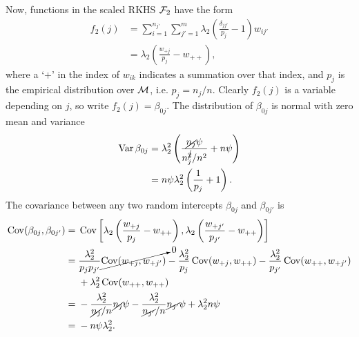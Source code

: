 Now, functions in the scaled RKHS ${\mathcal F}_2$ have the form
\begin{align*}
  f_2(j) 
  &= \sum_{i=1}^{n_{j'}}\sum_{j'=1}^m \lambda_2\left( \frac{\delta_{jj'}}{p_j} - 1 \right)w_{ij'} \\
  &=  \lambda_2\left( \frac{w_{+j}}{p_j} - w_{++} \right),
\end{align*}
where a `$+$' in the index of $w_{ik}$ indicates a summation over that index, and $p_j$ is the empirical distribution over ${\mathcal M}$, i.e. $p_j = n_j/n$.
Clearly $f_2(j)$ is a variable depending on $j$, so write $f_2(j)=\beta_{0j}$.
The distribution of $\beta_{0j}$ is normal with zero mean and variance
\begin{align*}
  \operatorname{Var} \beta_{0j} 
  &= \lambda_2^2 \left( \frac{\cancel{n_j}\psi}{n_j^{\cancel{2}} / n^2} + n\psi \right)  \\
  &= n\psi\lambda_2^2 \left( \frac{1}{p_j} + 1 \right).
\end{align*}
The covariance between any two random intercepts $\beta_{0j}$ and $\beta_{0j'}$ is
\begin{align*}
  \operatorname{Cov}(\beta_{0j},\beta_{0j'})
  ={}& \operatorname{Cov}\left[ \lambda_2\left( \frac{w_{+j}}{p_j} - w_{++} \right), \lambda_2\left( \frac{w_{+j'}}{p_{j'}} - w_{++} \right) \right]  \\
  ={}& \frac{\lambda_2^2}{p_j p_{j'}} \cancelto{0}{\operatorname{Cov}(w_{+j},w_{+j'})} - \frac{\lambda_2^2}{p_j} \operatorname{Cov}(w_{+j},w_{++}) - \frac{\lambda_2^2}{p_{j'}} \operatorname{Cov}(w_{++},w_{+j'}) \\
  & + \lambda_2^2 \operatorname{Cov}(w_{++},w_{++}) \\
  ={}& - \frac{\lambda_2^2}{\cancel{n_j}/n} \cancel{n_j}\psi - \frac{\lambda_2^2}{\cancel{n_{j'}}/n} \cancel{n_{j'}}\psi + \lambda_2^2 n\psi \\
  ={}& -n\psi\lambda_2^2.
\end{align*}

